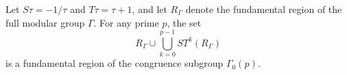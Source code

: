 Let $S\tau = -1/\tau$ and $T\tau = \tau + 1$, and let $R_\Gamma$ denote the fundamental region of the full modular group $\Gamma$. For any prime $p$, the set
$$R_\Gamma \cup \bigcup_{k=0}^{p-1} ST^k(R_\Gamma)$$
is a fundamental region of the congruence subgroup $\Gamma_0(p)$.
